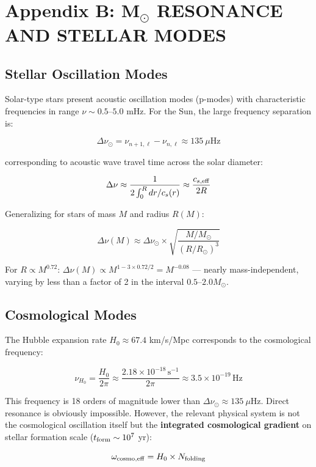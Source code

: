 \documentclass[10pt,a4paper]{article}
\begin{document}
\section*{Appendix B: M$_{\odot}$ RESONANCE AND STELLAR
MODES}\label{appendix-b-m-resonance-and-stellar-modes}

\subsection*{Stellar Oscillation
Modes}\label{b.1-stellar-oscillation-modes}

Solar-type stars present acoustic oscillation modes (p-modes) with
characteristic frequencies in range \(\nu \sim 0.5\)--\(5.0\) mHz. For
the Sun, the large frequency separation is:

\[\Delta\nu_\odot = \nu_{n+1,\ell} - \nu_{n,\ell} \approx 135~\mu\mathrm{Hz}\]

corresponding to acoustic wave travel time across the solar diameter:

\[\Delta\nu \approx \frac{1}{2\int_0^R dr/c_s(r)} \approx \frac{c_{s,\rm eff}}{2R}\]

Generalizing for stars of mass \(M\) and radius \(R(M)\):

\[\Delta\nu(M) \approx \Delta\nu_\odot \times \sqrt{\frac{M/M_\odot}{(R/R_\odot)^3}}\]

For \(R \propto M^{0.72}\):
\(\Delta\nu(M) \propto M^{1 - 3\times0.72/2} = M^{-0.08}\) --- nearly
mass-independent, varying by less than a factor of 2 in the interval
\(0.5\)--\(2.0 M_\odot\).

\subsection*{Cosmological Modes}\label{b.2-cosmological-modes}

The Hubble expansion rate \(H_0 \approx 67.4\) km/s/Mpc corresponds to
the cosmological frequency:

\[\nu_{H_0} = \frac{H_0}{2\pi} \approx \frac{2.18\times10^{-18}\,\mathrm{s}^{-1}}{2\pi} \approx 3.5\times10^{-19}\,\mathrm{Hz}\]

This frequency is 18 orders of magnitude lower than
\(\Delta\nu_\odot \approx 135~\mu\mathrm{Hz}\). Direct resonance is
obviously impossible. However, the relevant physical system is not the
cosmological oscillation itself but the \textbf{integrated cosmological
gradient} on stellar formation scale (\(t_{\rm form} \sim 10^7\) yr):

\[\omega_{\rm cosmo,eff} = H_0 \times N_{\rm folding}\]
\end{document}
